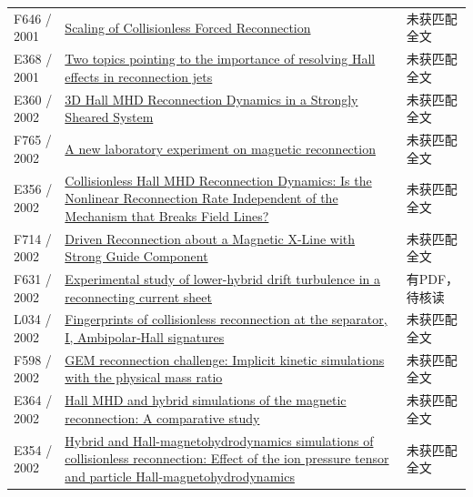 \begin{longtable}{P{24mm}P{97mm}P{27mm}}
F646 / 2001 & \href{https://doi.org/10.1103/physrevlett.87.265003}{Scaling of Collisionless Forced Reconnection} & 未获匹配全文\\

E368 / 2001 & \href{https://ui.adsabs.harvard.edu/abs/2001sps..proc..140F/abstract}{Two topics pointing to the importance of resolving Hall effects in reconnection jets} & 未获匹配全文\\

E360 / 2002 & \href{http://ui.adsabs.harvard.edu/abs/2002AGUFMSM61A0471H/abstract}{3D Hall MHD Reconnection Dynamics in a Strongly Sheared System} & 未获匹配全文\\

F765 / 2002 & \href{https://doi.org/10.1063/1.1459455}{A new laboratory experiment on magnetic reconnection} & 未获匹配全文\\

E356 / 2002 & \href{https://ui.adsabs.harvard.edu/abs/2002AGUFMSM61A0472B/abstract}{Collisionless Hall MHD Reconnection Dynamics: Is the Nonlinear Reconnection Rate Independent of the Mechanism that Breaks Field Lines?} & 未获匹配全文\\

F714 / 2002 & \href{https://doi.org/10.1103/physrevlett.89.055002}{Driven Reconnection about a Magnetic X-Line with Strong Guide Component} & 未获匹配全文\\

F631 / 2002 & \href{https://doi.org/10.1063/1.1494433}{Experimental study of lower-hybrid drift turbulence in a reconnecting current sheet} & 有PDF，待核读\\

L034 / 2002 & \href{https://doi.org/10.1029/2001ja000126}{Fingerprints of collisionless reconnection at the separator,  I,  Ambipolar‐Hall signatures} & 未获匹配全文\\

F598 / 2002 & \href{https://doi.org/10.1029/2002gl015314}{GEM reconnection challenge: Implicit kinetic simulations with the physical mass ratio} & 未获匹配全文\\

E364 / 2002 & \href{https://ui.adsabs.harvard.edu/abs/2002AGUFMSM61A0480K/abstract}{Hall MHD and hybrid simulations of the magnetic reconnection: A comparative study} & 未获匹配全文\\

E354 / 2002 & \href{https://doi.org/10.1063/1.1474424}{Hybrid and Hall-magnetohydrodynamics simulations of collisionless reconnection: Effect of the ion pressure tensor and particle Hall-magnetohydrodynamics} & 未获匹配全文\\


\end{longtable}
